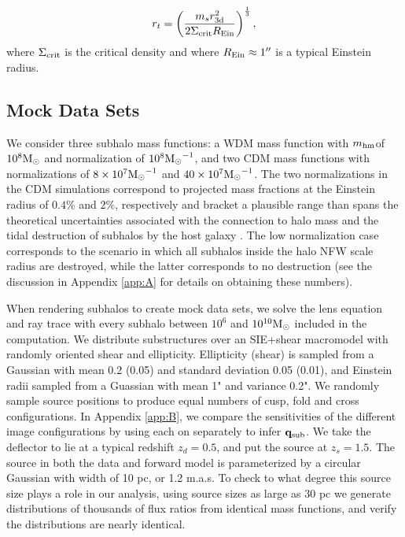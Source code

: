 \begin{equation} 
\label{eqn:truncrad}
r_t = \left(\frac{m_{s} r_{\rm{3d}}^2}{2 \Sigma_{\rm{crit}} R_{\rm{Ein}}}\right)^{\frac{1}{3}},
\end{equation}
where $\Sigma_{\rm{crit}}$ is the critical density and where $R_{\rm{Ein}} \approx 1''$ is a typical Einstein radius. 

\subsection{Mock Data Sets}
\label{ssec:mockdata}
We consider three subhalo mass functions: a WDM mass function with $m_{\rm{hm}}$of $10^8 {\rm{M}_{\odot}}$ and normalization of $10^8 {\rm{M}_{\odot}}^{-1}$, and two CDM mass functions with normalizations of $8\times 10^7 {\rm{M}_{\odot}}^{-1}$ and $40 \times 10^7 {\rm{M}_{\odot}}^{-1}$. The two normalizations in the CDM simulations correspond to projected mass fractions at the Einstein radius of $0.4\%$ and $2\%$, respectively and bracket a plausible range than spans the theoretical uncertainties associated with the connection to halo mass \cite{JiangvdB17} and the tidal destruction of subhalos by the host galaxy \cite{DespVeg16,GK++17}. The low normalization case corresponds to the scenario in which all subhalos inside the halo NFW scale radius are destroyed, while the latter corresponds to no destruction (see the discussion in Appendix \ref{app:A} for details on obtaining these numbers).

When rendering subhalos to create mock data sets, we solve the lens equation and ray trace with every subhalo between $10^6$ and $10^{10} {\rm{M}_{\odot}}$ included in the computation. We distribute substructures over an SIE+shear macromodel with randomly oriented shear and ellipticity. Ellipticity (shear) is sampled from a Gaussian with mean 0.2 (0.05) and standard deviation 0.05 (0.01), and Einstein radii sampled from a Guassian with mean 1" and variance 0.2". We randomly sample source positions to produce equal numbers of cusp, fold and cross configurations. In Appendix \ref{app:B}, we %
compare the sensitivities of the different image configurations by using each on separately to infer ${\bf{q}_{\rm{sub}}}$. We take the deflector to lie at a typical redshift $z_d = 0.5$, and put the source at $z_s = 1.5$. The source in both the data and forward model is parameterized by a circular Gaussian with width of 10 pc, or 1.2 m.a.s. To check to what degree this source size plays a role in our analysis, using source sizes as large as 30 pc we generate distributions of thousands of flux ratios from identical mass functions, and verify the distributions are nearly identical. 

